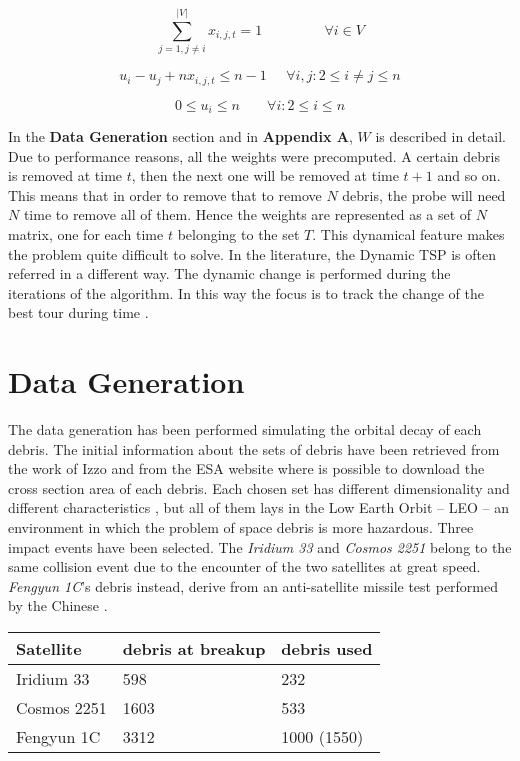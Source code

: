 \documentclass[a4paper,9pt,journal,twoside,compsoc]{PPIEEEtran}
\begin{document}
\begin{equation}
\sum_{j=1, j \neq i}^{|V|} x_{i,j,t} = 1 \;\;\;\;\;\;\;\;\;\;\;\;\;\;\;\; \forall i \in V
\end{equation}

\begin{equation}
 u_i - u_j + nx_{i,j,t} \leq n - 1  \;\;\;\;\; \forall i,j : 2 \leq i \neq j \leq n
\end{equation}

\begin{equation}
 0 \leq u_i \leq n \;\;\;\;\;\;\; \forall i : 2 \leq i \leq n
\end{equation}


In the \textbf{Data Generation} section and in \textbf{Appendix A}, $W$ is described in detail. 
Due to performance reasons, all the weights were precomputed. A certain debris is removed at time $t$, then the next one will be removed at time $t+1$ and so on. This means that in order to remove that to remove $N$ debris, the probe will need $N$ time to remove all of them. Hence the weights are represented as a set of $N$ matrix, one for each time $t$ belonging to the set $T$.  This dynamical feature makes the problem quite difficult to solve.
In the literature, the Dynamic TSP is often referred in a different way. The dynamic change is performed during the iterations of the algorithm. In this way the focus is to track the change of the best tour during time \cite{trafficjam} \cite{pheromod} \cite{immigrants}.


\section{Data Generation}\label{sec:datagen}
The data generation has been performed simulating the orbital decay of each debris. The initial information about the sets of debris have been retrieved from the work of Izzo \cite{izzo} and from the ESA website \cite{act} where is possible to download the cross section area of each debris. Each chosen set has different dimensionality and different characteristics \cite{nasahistory}, but all of them lays in the Low Earth Orbit -- LEO -- an environment in which the problem of space debris is more hazardous. Three impact events have been selected. The \textit{Iridium 33} and \textit{Cosmos 2251} belong to the same collision event due to the encounter of the two satellites at great speed. \textit{Fengyun 1C}'s debris instead, derive from an anti-satellite missile test performed by the Chinese \cite{china} \cite{nasahistory}.
\begin{center}
\begin{tabular}{| l | l | l |}
\hline
\textbf{Satellite} & \textbf{debris at breakup} & \textbf{debris used} \\ \hline
     Iridium 33 & 598 & 232 \\ \hline
     Cosmos 2251 & 1603 & 533 \\ \hline
     Fengyun 1C & 3312 & 1000 (1550) \\ \hline
\end{tabular}
\end{center}
\end{document}
